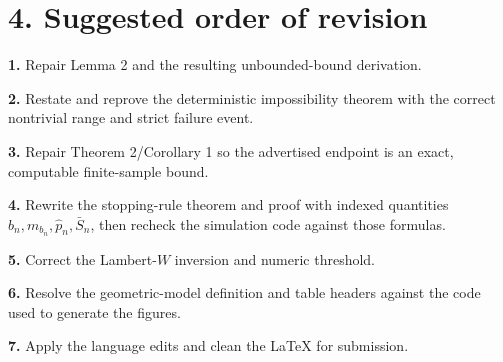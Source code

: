 \documentclass[10pt,a4paper]{article}
\begin{document}
\section*{4. Suggested order of revision}

\par\medskip\noindent\textbf{1.} Repair Lemma 2 and the resulting unbounded-bound derivation.
\par\medskip\noindent\textbf{2.} Restate and reprove the deterministic impossibility theorem with the correct nontrivial range and strict failure event.
\par\medskip\noindent\textbf{3.} Repair Theorem 2/Corollary 1 so the advertised endpoint is an exact, computable finite-sample bound.
\par\medskip\noindent\textbf{4.} Rewrite the stopping-rule theorem and proof with indexed quantities \(b_n,m_{b_n},\hat p_n,\bar S_n\), then recheck the simulation code against those formulas.
\par\medskip\noindent\textbf{5.} Correct the Lambert-\(W\) inversion and numeric threshold.
\par\medskip\noindent\textbf{6.} Resolve the geometric-model definition and table headers against the code used to generate the figures.
\par\medskip\noindent\textbf{7.} Apply the language edits and clean the LaTeX for submission.
\end{document}
